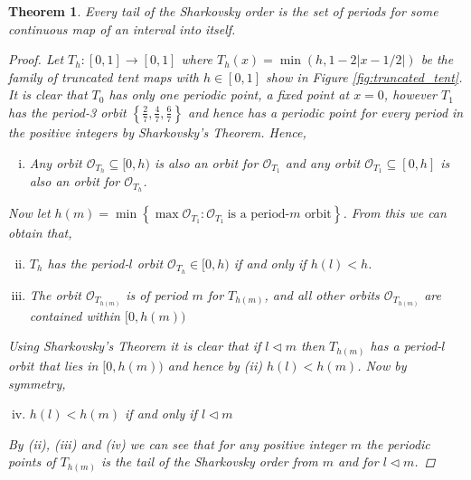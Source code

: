 \documentclass[11pt,a4paper,oneside]{memoir}
\theoremstyle{plain}
\newtheorem{thm}{Theorem}[chapter]
\theoremstyle{definition}
\begin{document}
\begin{thm}
    Every tail of the Sharkovsky order is the set of periods for some continuous map of an interval into itself.
    \begin{proof}
        Let $T_h: [0, 1] \to [0, 1]$ where $T_h(x) = \min(h, 1-2|x-1/2|)$ be the family of truncated tent maps with $h \in [0, 1]$ show in Figure \ref{fig:truncated_tent}. It is clear that $T_0$ has only one periodic point, a fixed point at $x = 0$, however $T_1$ has the period-3 orbit $\left\lbrace \frac{2}{7}, \frac{4}{7}, \frac{6}{7} \right\rbrace$ and hence has a periodic point for every period in the positive integers by Sharkovsky's Theorem. Hence,
        \begin{enumerate}[(i)]
            \item Any orbit $\mathcal{O}_{T_h} \subseteq [0, h)$ is also an orbit for $\mathcal O_{T_1}$ and any orbit $\mathcal{O}_{T_1} \subseteq [0, h]$ is also an orbit for $\mathcal{O}_{T_h}$.
        \end{enumerate}
        Now let $h(m) = \min \left\lbrace \max \mathcal{O}_{T_1} : \mathcal{O}_{T_1} \ \text{is a period-$m$ orbit} \right\rbrace$. From this we can obtain that,
        
        \begin{enumerate}[(i)]\setcounter{enumi}{1}
            \item $T_h$ has the period-$l$ orbit $\mathcal{O}_{T_h} \in [0, h)$ if and only if $h(l) < h$.
            \item The orbit $\mathcal{O}_{T_{h(m)}}$ is of period $m$ for $T_{h(m)}$, and all other orbits $\mathcal{O}_{T_{h(m)}}$ are contained within $[0, h(m))$
        \end{enumerate}
        Using Sharkovsky's Theorem it is clear that if $l \lhd m$ then $T_{h(m)}$ has a period-$l$ orbit that lies in $[0, h(m))$ and hence by (ii) $h(l) < h(m)$. Now by symmetry,
        \begin{enumerate}[(i)]\setcounter{enumi}{3}
            \item $h(l) < h(m)$ if and only if $l \lhd m$
        \end{enumerate}
        By (ii), (iii) and (iv) we can see that for any positive integer $m$ the periodic points of $T_{h(m)}$ is the tail of the Sharkovsky order from $m$ and for $l \lhd m$.

    \end{proof}


\end{thm}
\end{document}
